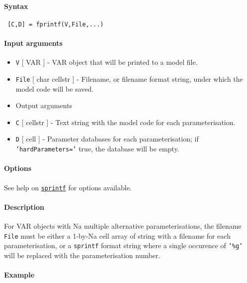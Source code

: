 


	\paragraph{Syntax}
 
 \begin{verbatim}
 [C,D] = fprintf(V,File,...)
 \end{verbatim}
 
 \paragraph{Input arguments}
 
 \begin{itemize}
 \item
   \texttt{V} {[} VAR {]} - VAR object that will be printed to a model
   file.
 \item
   \texttt{File} {[} char \textbar{} cellstr {]} - Filename, or filename
   format string, under which the model code will be saved.
 \item
   Output arguments
 \item
   \texttt{C} {[} cellstr {]} - Text string with the model code for each
   parameterisation.
 \item
   \texttt{D} {[} cell {]} - Parameter databases for each
   parameterisation; if \texttt{'hardParameters='} true, the database
   will be empty.
 \end{itemize}
 
 \paragraph{Options}
 
 See help on \href{VAR/sprintf}{\texttt{sprintf}} for options available.
 
 \paragraph{Description}
 
 For VAR objects with Na multiple alternative parameterisations, the
 filename \texttt{File} must be either a 1-by-Na cell array of string
 with a filename for each parameterisation, or a \texttt{sprintf} format
 string where a single occurence of \texttt{'\%g'} will be replaced with
 the parameterisation number.
 
 \paragraph{Example}


